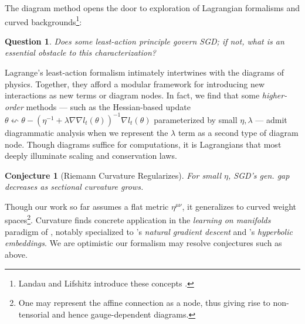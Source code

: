 \documentclass{article}
\theoremstyle{plain}
\newtheorem{conj}{Conjecture}
\newtheorem{quest}{Question}
\theoremstyle{definition}
\begin{document}
        The diagram method opens the door to exploration of Lagrangian
        formalisms and curved backgrounds\footnote{
            Landau and Lifshitz introduce these concepts
            .
        }:
        \begin{quest}
            Does some least-action principle govern SGD; if not, what is an
            essential obstacle to this characterization?
        \end{quest}
        Lagrange's least-action formalism intimately intertwines with the
        diagrams of physics.  Together, they afford a modular framework for
        introducing new interactions as new terms or diagram nodes.  In fact,
        we find that some \emph{higher-order} methods --- such as the
        Hessian-based update
        $
            \theta \leftsquigarrow
            \theta -
            (\eta^{-1} + \lambda \nabla \nabla l_t(\theta))^{-1}
            \nabla l_t(\theta)
        $
        parameterized by small $\eta, \lambda$ --- admit diagrammatic analysis
        when we represent the $\lambda$ term as a second type of diagram node.
        Though diagrams suffice for computations, it is Lagrangians that most
        deeply illuminate scaling and conservation laws.
        \begin{conj}[Riemann Curvature Regularizes]
            For small $\eta$, SGD's gen. gap decreases as sectional curvature
            grows.
        \end{conj}
        Though our work so far assumes a flat metric $\eta^{\mu\nu}$, it
        generalizes to curved weight spaces\footnote{
            One may represent the affine connection as a node, thus giving
            rise to non-tensorial and hence gauge-dependent diagrams.
        }.
        Curvature finds concrete application in the \emph{learning on
        manifolds} paradigm of \citet{ab07, zh16}, notably specialized to
        \citet{am98}'s \emph{natural gradient descent} and \citet{ni17}'s
        \emph{hyperbolic embeddings}.  We are optimistic our formalism may
        resolve conjectures such as above.


\end{document}
